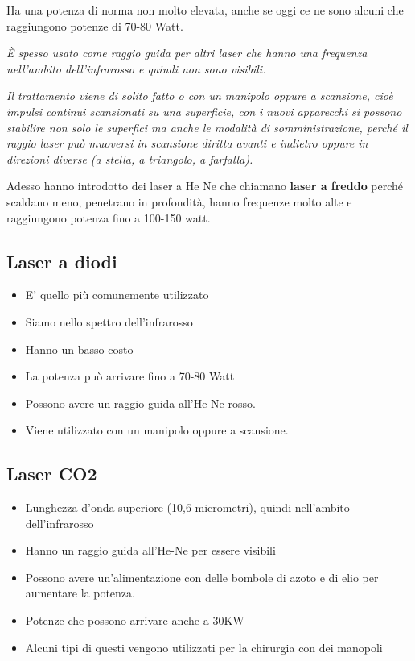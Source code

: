Ha una potenza di norma non molto elevata, anche se oggi ce ne sono
alcuni che raggiungono potenze di 70-80 Watt.

\emph{È spesso usato come raggio guida per altri laser che hanno una
frequenza nell'ambito dell'infrarosso e quindi non sono visibili. }

\emph{Il trattamento viene di solito fatto o con un manipolo oppure a
scansione, cioè impulsi continui scansionati su una superficie, con i
nuovi apparecchi si possono stabilire non solo le superfici ma anche le
modalità di somministrazione, perché il raggio laser può muoversi in
scansione diritta avanti e indietro oppure in direzioni diverse (a
stella, a triangolo, a farfalla).}

Adesso hanno introdotto dei laser a He Ne che chiamano \textbf{laser a
freddo} perché scaldano meno, penetrano in profondità, hanno frequenze
molto alte e raggiungono potenza fino a 100-150 watt.

\subsection{Laser a diodi }

\begin{itemize}
\item
  E' quello più comunemente utilizzato
\item
  Siamo nello spettro dell'infrarosso
\item
  Hanno un basso costo
\item
  La potenza può arrivare fino a 70-80 Watt
\item
  Possono avere un raggio guida all'He-Ne rosso.
\item
  Viene utilizzato con un manipolo oppure a scansione.
\end{itemize}

\subsection{Laser CO2}

\begin{itemize}
\item
  Lunghezza d'onda superiore (10,6 micrometri), quindi nell'ambito
  dell'infrarosso
\item
  Hanno un raggio guida all'He-Ne per essere visibili
\item
  Possono avere un'alimentazione con delle bombole di azoto e di elio
  per aumentare la potenza.
\item
  Potenze che possono arrivare anche a 30KW
\item
  Alcuni tipi di questi vengono utilizzati per la chirurgia con dei
  manopoli
\end{itemize}

